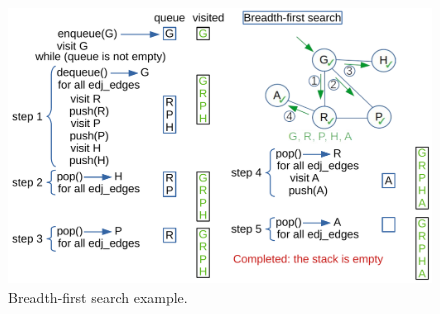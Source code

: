 \begin{figure}[H]
	\begin{center}
		\includegraphics[scale=.6]{chapters/appendix/images/appendixgraphs/graphsappendix_2.pdf}
		\caption[Breadth-first search example.]{Breadth-first search example.}
		\label{graphappendix_2}
	\end{center}
\end{figure}
